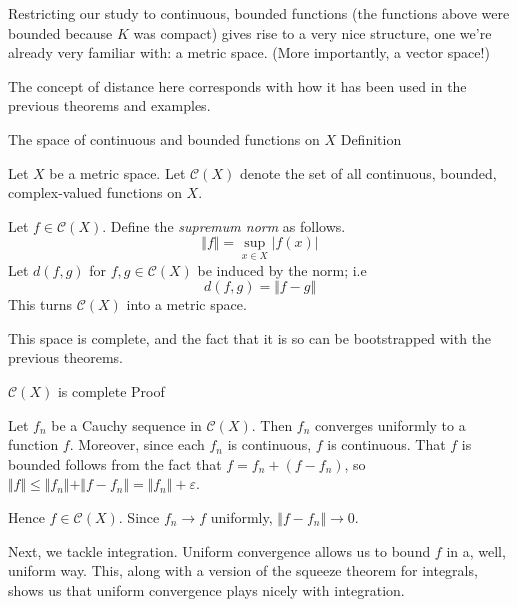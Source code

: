Restricting our study to continuous, bounded functions (the functions above were bounded because $K$ was compact) gives rise to a very nice structure, one we're already very familiar with: a metric space. (More importantly, a vector space!)

The concept of distance here corresponds with how it has been used in the previous theorems and examples.

\begin{result}
    {The space of continuous and bounded functions on $X$}
    {Definition}

    Let $X$ be a metric space. Let $\mathscr{C}(X)$ denote the set of all continuous, bounded, complex-valued functions on $X$.

    Let $f \in \mathscr{C}(X)$. Define the \textit{supremum norm} as follows.
    \[\Vert f \Vert = \sup_{x \in X} |f(x)|\]
    Let $d(f, g)$ for $f, g \in \mathscr{C}(X)$ be induced by the norm; i.e
    \[d(f, g) = \Vert f - g \Vert\]
    This turns $\mathscr{C}(X)$ into a metric space.
\end{result}

This space is complete, and the fact that it is so can be bootstrapped with the previous theorems.

\begin{result}
    {$\mathscr{C}(X)$ is complete}
    {Proof}

    Let $f_n$ be a Cauchy sequence in $\mathscr{C}(X)$. Then $f_n$ converges uniformly to a function $f$. Moreover, since each $f_n$ is continuous, $f$ is continuous. That $f$ is bounded follows from the fact that $f = f_n + (f - f_n)$, so $\Vert f \Vert \leq \Vert f_n \Vert + \Vert f - f_n \Vert = \Vert f_n \Vert + \varepsilon$. 

    Hence $f \in \mathscr{C}(X)$. Since $f_n \rightarrow f$ uniformly, $\Vert f - f_n \Vert \rightarrow 0$.
\end{result}


Next, we tackle integration. Uniform convergence allows us to bound $f$ in a, well, uniform way. This, along with a version of the squeeze theorem for integrals, shows us that uniform convergence plays nicely with integration.

